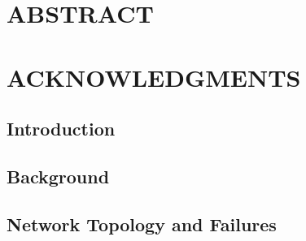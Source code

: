 

\graphicspath{{./figs/}}



\begin{doublespace}

\chapter*{ABSTRACT}



\chapter*{ACKNOWLEDGMENTS}



\begin{onehalfspace}
\tableofcontents
\listoftables
\listoffigures
\end{onehalfspace}

\mainmatter

\setcounter{page}{0}


\begin{singlespace}
\newcommand{\chapterOneName}{Introduction}
\chapter[\chapterOneName]{\MakeUppercase\chapterOneName} \label{chapter:introduction}
\end{singlespace}


\begin{singlespace}
\newcommand{\chapterTwoName}{Background}
\chapter[\chapterTwoName]{\MakeUppercase\chapterTwoName} \label{chapter:background}
\end{singlespace}


\begin{singlespace}
\newcommand{\chapterThreeName}{Network Topology and Failures}
\chapter[\chapterThreeName]{\MakeUppercase\chapterThreeName}\label{chapter:c3}
\end{singlespace}



\end{doublespace}
